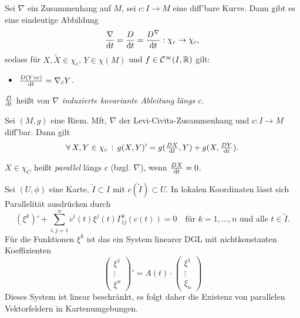 \documentclass{cheat-sheet}
\newcommand{\coord}[1]{\tfrac{\partial^\phi}{\partial x^{#1}}} %
\newcommand{\Cont}{\mathcal{C}} %
\begin{document}
\begin{satz}
  Sei $\nabla$ ein Zusammenhang auf $M$, sei $c : I \to M$ eine diff'bare Kurve. Dann gibt es eine eindeutige Abbildung
  \[ \frac{\nabla}{\mathrm{d} t} = \frac{D}{\mathrm{d} t} = \frac{D^\nabla}{\mathrm{d} t} : \chi_c \to \chi_c, \]
  sodass für $X, \tilde{X} \in \chi_c$, $Y \in \chi(M)$ und $f \in \Cont^\infty(I, \R)$ gilt:
  \begin{itemize}
    \item $\tfrac{D (Y \circ c)}{\mathrm{d} t} = \nabla_{\dot{c}} Y$.
  \end{itemize}
\end{satz}

\begin{defn}
  $\tfrac{D}{\mathrm{d} t}$ heißt von $\nabla$ \emph{induzierte kovariante Ableitung längs $c$}.
\end{defn}


\begin{satz}
  Sei $(M, g)$ eine Riem. Mft, $\nabla$ der Levi-Civita-Zusammenhang und $c : I \to M$ diff'bar. Dann gilt
  \[ \forall \, {X, Y \in \chi_c} \,:\, g(X, Y)' = g(\tfrac{D X}{\mathrm{d} t}, Y) + g(X, \tfrac{D Y}{\mathrm{d} t}). \]
\end{satz}


\begin{defn}
  $X \in \chi_C$ heißt \emph{parallel} längs $c$ (bzgl. $\nabla$), wenn $\tfrac{D X}{\mathrm{d} t} = 0$.
\end{defn}

\begin{bem}
  Sei $(U, \phi)$ eine Karte, $\tilde{I} \subset I$ mit $c(\tilde{I}) \subset U$.
  In lokalen Koordinaten lässt sich Parallelität ausdrücken durch
  \[
    (\xi^{k})' + \sum_{i,j=1}^n \dot{c}^i(t) \xi^j (t) \Gamma_{ij}^k(c(t)) = 0
    \quad \text{für $k = 1, \ldots, n$ und alle $t \in \tilde{I}$.}
  \]
  Für die Funktionen $\xi^k$ ist das ein System linearer DGL mit nichtkonstanten Koeffizienten
  \[
    \begin{pmatrix}
      \xi^1 \\
      \vdots \\
      \xi^n
    \end{pmatrix}' = A(t) \cdot
    \begin{pmatrix}
      \xi^1 \\
      \vdots \\
      \xi_n
    \end{pmatrix}
  \]
  Dieses System ist linear beschränkt, es folgt daher die Existenz von parallelen Vektorfeldern in Kartenumgebungen.
\end{bem}
\end{document}
